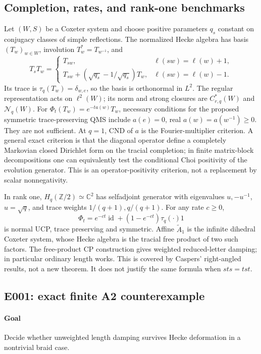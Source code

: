 \documentclass[11pt]{article}
\theoremstyle{remark}\newtheorem{remark}[definition]{Remark}
\newcommand{\id}{\operatorname{id}}
\newcommand{\C}{\mathbb{C}}
\newcommand{\Z}{\mathbb{Z}}
\begin{document}
\subsection{Completion, rates, and rank-one benchmarks}
Let $(W,S)$ be a Coxeter system and choose positive parameters $q_s$ constant
on conjugacy classes of simple reflections. The normalized Hecke algebra
has basis $(T_w)_{w\in W}$, involution $T_w^*=T_{w^{-1}}$, and
\[
 T_sT_w=\begin{cases}T_{sw},&\ell(sw)=\ell(w)+1,\\
 T_{sw}+(\sqrt{q_s}-1/\sqrt{q_s})T_w,&\ell(sw)=\ell(w)-1.
 \end{cases}
\]
Its trace is $\tau_q(T_w)=\delta_{w,e}$, so the basis is orthonormal in
$L^2$. The regular representation acts on $\ell^2(W)$; its norm and strong
closures are $C^*_{r,q}(W)$ and $\mathcal N_q(W)$.
For $\Phi_t(T_w)=e^{-ta(w)}T_w$, necessary conditions for the proposed
symmetric trace-preserving QMS include $a(e)=0$, real
$a(w)=a(w^{-1})\geq0$. They are not sufficient.
At $q=1$, CND of $a$ is the Fourier-multiplier criterion.
A general exact criterion is that the diagonal operator define a completely
Markovian closed Dirichlet form on the tracial completion; in finite
matrix-block decompositions one can equivalently test the conditional Choi
positivity of the evolution generator. This is an operator-positivity
criterion, not a replacement by scalar nonnegativity.

In rank one, $H_q(\Z/2)\simeq\C^2$ has selfadjoint generator with eigenvalues
$u,-u^{-1}$, $u=\sqrt q$, and trace weights
$1/(q+1),q/(q+1)$. For any rate $c\geq0$,
\[
 \Phi_t=e^{-ct}\id+(1-e^{-ct})\tau_q(\cdot)1
\]
is normal UCP, trace preserving and symmetric. Affine $\widetilde A_1$
is the infinite dihedral Coxeter system, whose Hecke algebra is the tracial
free product of two such factors. The free-product CP construction gives
weighted reduced-letter damping; in particular ordinary length works.
This is covered by Caspers' right-angled results, not a new theorem.
It does not justify the same formula when $sts=tst$.

\subsection{E001: exact finite A2 counterexample}
\paragraph{Goal} Decide whether unweighted length damping survives Hecke
deformation in a nontrivial braid case.
\end{document}
